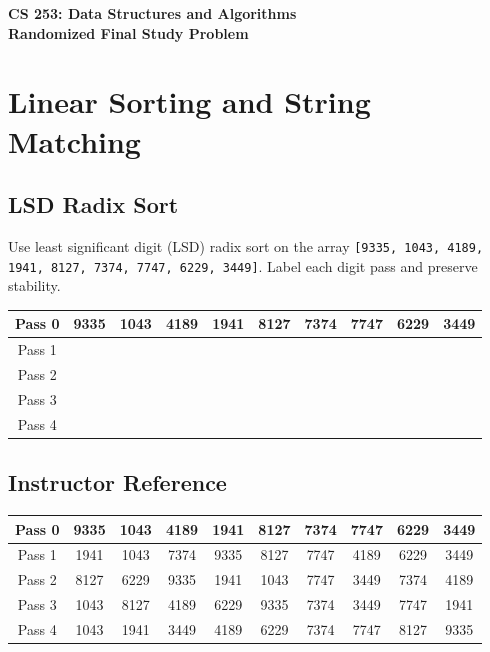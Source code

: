 \documentclass[11pt]{article}
\begin{document}
\begin{center}
    \Large\textbf{CS 253: Data Structures and Algorithms}\\
    \large\textbf{Randomized Final Study Problem}
\end{center}
\vspace{1em}


\section*{Linear Sorting and String Matching}
\subsection*{LSD Radix Sort}
Use least significant digit (LSD) radix sort on the array \texttt{[9335, 1043, 4189, 1941, 8127, 7374, 7747, 6229, 3449]}. Label each digit pass and preserve stability.

\begin{center}
\begin{tabular}{|c|c|c|c|c|c|c|c|c|c|}
\hline
 Pass 0 & 9335 & 1043 & 4189 & 1941 & 8127 & 7374 & 7747 & 6229 & 3449 \\
\hline
 Pass 1 & \phantom{0} & \phantom{0} & \phantom{0} & \phantom{0} & \phantom{0} & \phantom{0} & \phantom{0} & \phantom{0} & \phantom{0} \\
\hline
 Pass 2 & \phantom{0} & \phantom{0} & \phantom{0} & \phantom{0} & \phantom{0} & \phantom{0} & \phantom{0} & \phantom{0} & \phantom{0} \\
\hline
 Pass 3 & \phantom{0} & \phantom{0} & \phantom{0} & \phantom{0} & \phantom{0} & \phantom{0} & \phantom{0} & \phantom{0} & \phantom{0} \\
\hline
 Pass 4 & \phantom{0} & \phantom{0} & \phantom{0} & \phantom{0} & \phantom{0} & \phantom{0} & \phantom{0} & \phantom{0} & \phantom{0} \\
\hline
\end{tabular}
\end{center}

\subsection*{Instructor Reference}
\begin{center}
\begin{tabular}{|c|c|c|c|c|c|c|c|c|c|}
\hline
 Pass 0 & 9335 & 1043 & 4189 & 1941 & 8127 & 7374 & 7747 & 6229 & 3449 \\
\hline
 Pass 1 & 1941 & 1043 & 7374 & 9335 & 8127 & 7747 & 4189 & 6229 & 3449 \\
\hline
 Pass 2 & 8127 & 6229 & 9335 & 1941 & 1043 & 7747 & 3449 & 7374 & 4189 \\
\hline
 Pass 3 & 1043 & 8127 & 4189 & 6229 & 9335 & 7374 & 3449 & 7747 & 1941 \\
\hline
 Pass 4 & 1043 & 1941 & 3449 & 4189 & 6229 & 7374 & 7747 & 8127 & 9335 \\
\hline
\end{tabular}
\end{center}
\end{document}
